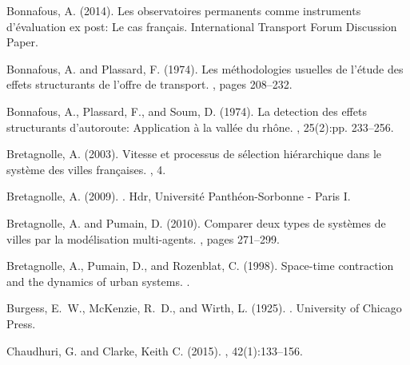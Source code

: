 \documentclass[11pt]{article}
\begin{document}
\begin{thebibliography}{}
Bonnafous, A. (2014).
\newblock Les observatoires permanents comme instruments d'{\'e}valuation ex
  post: Le cas fran{\c{c}}ais.
\newblock International Transport Forum Discussion Paper.

Bonnafous, A. and Plassard, F. (1974).
\newblock Les m{\'e}thodologies usuelles de l'{\'e}tude des effets structurants
  de l'offre de transport.
, pages 208--232.

Bonnafous, A., Plassard, F., and Soum, D. (1974).
\newblock La detection des effets structurants d'autoroute: Application {\`a}
  la vall{\'e}e du rh{\^o}ne.
, 25(2):pp. 233--256.

Bretagnolle, A. (2003).
\newblock Vitesse et processus de s{\'e}lection hi{\'e}rarchique dans le
  syst{\`e}me des villes fran{\c{c}}aises.
, 4.

Bretagnolle, A. (2009).
.
\newblock Hdr, Universit{\'e} Panth{\'e}on-Sorbonne - Paris I.

Bretagnolle, A. and Pumain, D. (2010).
\newblock Comparer deux types de syst{\`e}mes de villes par la mod{\'e}lisation
  multi-agents.
, pages 271--299.

Bretagnolle, A., Pumain, D., and Rozenblat, C. (1998).
\newblock Space-time contraction and the dynamics of urban systems.
.

Burgess, E.~W., McKenzie, R.~D., and Wirth, L. (1925).
.
\newblock University of Chicago Press.

{Chaudhuri, G. and Clarke, Keith C.} ({2015}).
,
  42(1):133--156.


\end{thebibliography}
\end{document}
